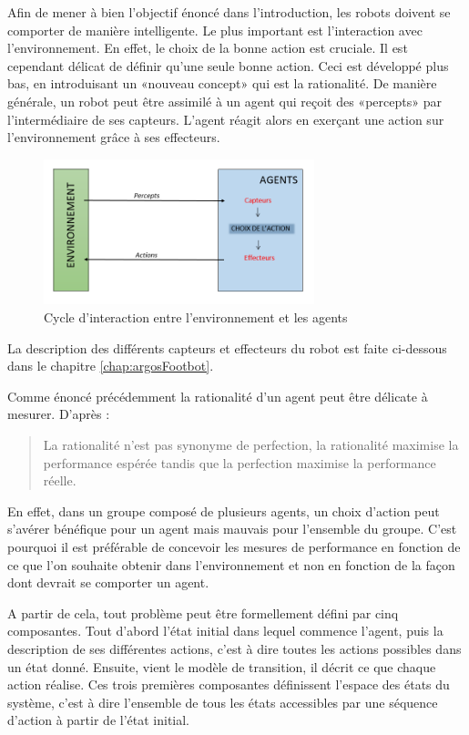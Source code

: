 \documentclass[a4paper,11pt]{report}
\begin{document}
Afin de mener à bien l'objectif énoncé dans l'introduction, les robots doivent se comporter de manière intelligente. Le plus important est l'interaction avec l'environnement. En effet, le choix de la bonne action est cruciale. Il est cependant délicat de définir qu'une seule bonne action. Ceci est développé plus bas, en introduisant un «nouveau concept» qui est la rationalité. 
De manière générale, un robot peut être assimilé à un agent qui reçoit des «percepts» par l'intermédiaire de ses capteurs. L'agent réagit alors en exerçant une action sur l'environnement grâce à ses effecteurs.
\begin{figure}[h!]
  \centering
  \includegraphics[width=0.7\textwidth]{cycleInteractionAI.png}
    \caption{Cycle d'interaction entre l'environnement et les agents}
\end{figure}
La description des différents capteurs et effecteurs du robot est faite ci-dessous dans le chapitre \ref{chap:argosFootbot}.

Comme énoncé précédemment la rationalité d'un agent peut être délicate à mesurer. D'après \cite{AIBrique}:
\begin{quote}
  \og{}La rationalité n'est pas synonyme de perfection, la rationalité maximise la performance espérée tandis que la perfection maximise la performance réelle.\fg{}
\end{quote}


En effet, dans un groupe composé de plusieurs agents, un choix d'action peut s'avérer bénéfique pour un agent mais mauvais pour l'ensemble du groupe. C'est pourquoi il est préférable de concevoir les mesures de performance en fonction de ce que l'on souhaite obtenir dans l'environnement et non en fonction de la façon dont devrait se comporter un agent.

A partir de cela, tout problème peut être formellement défini par cinq composantes. Tout d'abord l'état initial dans lequel commence l'agent, puis la description de ses différentes actions, c'est à dire toutes les actions possibles dans un état donné. Ensuite, vient le modèle de transition, il décrit ce que chaque action réalise. Ces trois premières composantes définissent l'espace des états du système, c'est à dire l'ensemble de tous les états accessibles par une séquence d'action à partir de l'état initial.
\end{document}
